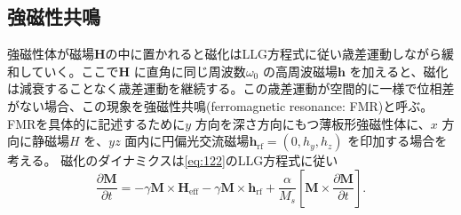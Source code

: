 \documentclass[dvipdfmx]{jsreport}
\numberwithin{equation}{chapter}
\numberwithin{table}{chapter}
\begin{document}
\subsection{強磁性共鳴}
強磁性体が磁場$\bm{H}$の中に置かれると磁化はLLG方程式に従い歳差運動しながら緩和していく。ここで$\bm{H}$ に直角に同じ周波数$\omega_0$ の高周波磁場$\bm{h}$ を加えると、磁化は減衰することなく歳差運動を継続する。この歳差運動が空間的に一様で位相差がない場合、この現象を強磁性共鳴(ferromagnetic resonance: FMR)と呼ぶ。FMRを具体的に記述するために$y$ 方向を深さ方向にもつ薄板形強磁性体に、$x$ 方向に静磁場$H$ を、$yz$ 面内に円偏光交流磁場$\bm{h}_\text{rf} =(0,h_y,h_z)$ を印加する場合を考える。
磁化のダイナミクスは\eqref{eq:122}のLLG方程式に従い
\begin{equation}
\label{eq:130}
	\frac{\partial \bm{M}}{\partial t} =-\gamma\bm{M}\times \bm{H}_\text{eff}-\gamma \bm{M}\times \bm{h}_\text{rf} +\frac{\alpha}{M_s}\left[ \bm{M}\times \frac{\partial \bm{M}}{\partial t}  \right] 
.\end{equation}
\end{document}
